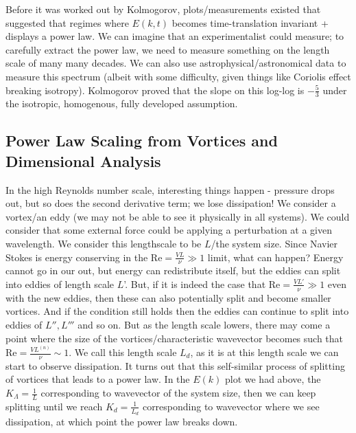Before it was worked out by Kolmogorov, plots/measurements existed that suggested that regimes where $E(k, t)$ becomes time-translation invariant + displays a power law. We can imagine that an experimentalist could measure; to carefully extract the power law, we need to measure something on the length scale of many many decades. We can also use astrophysical/astronomical data to measure this spectrum (albeit with some difficulty, given things like Coriolis effect breaking isotropy). Kolmogorov proved that the slope on this log-log is $-\frac{5}{3}$ under the isotropic, homogenous, fully developed assumption.

\subsection{Power Law Scaling from Vortices and Dimensional Analysis}

In the high Reynolds number scale, interesting things happen - pressure drops out, but so does the second derivative term; we lose dissipation! We consider a vortex/an eddy (we may not be able to see it physically in all systems). We could consider that some external force could be applying a perturbation at a given wavelength. We consider this lengthscale to be $L$/the system size. Since Navier Stokes is energy conserving in the $\text{Re} = \frac{VL}{\nu} \gg 1$ limit, what can happen? Energy cannot go in our out, but energy can redistribute itself, but the eddies can split into eddies of length scale $L$'. But, if it is indeed the case that $\text{Re} = \frac{VL'}{\nu} \gg 1$ even with the new eddies, then these can also potentially split and become smaller vortices. And if the condition still holds then the eddies can continue to split into eddies of $L'', L'''$ and so on. But as the length scale lowers, there may come a point where the size of the vortices/characteristic wavevector becomes such that $\text{Re} = \frac{VL^{(n)}}{\nu} \sim 1$. We call this length scale $L_d$, as it is at this length scale we can start to observe dissipation. It turns out that this self-similar process of splitting of vortices that leads to a power law. In the $E(k)$ plot we had above, the $K_\Lambda = \frac{1}{L}$ corresponding to wavevector of the system size, then we can keep splitting until we reach $K_d = \frac{1}{L_d}$ corresponding to wavevector where we see dissipation, at which point the power law breaks down.


